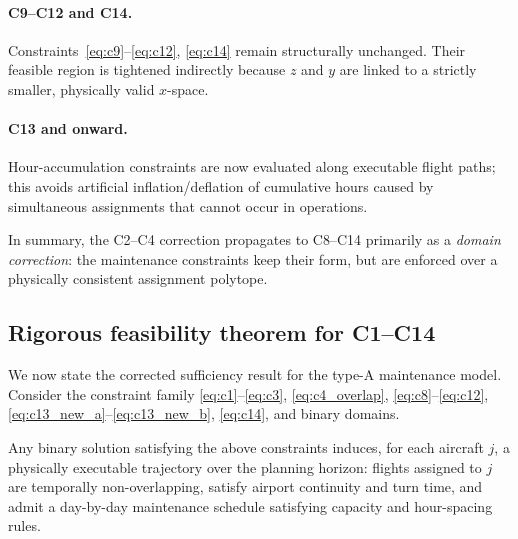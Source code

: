 \paragraph{C9--C12 and C14.}
Constraints~\eqref{eq:c9}--\eqref{eq:c12}, \eqref{eq:c14} remain structurally unchanged. Their
feasible region is tightened indirectly because $z$ and $y$ are linked to a
strictly smaller, physically valid $x$-space.

\paragraph{C13 and onward.}
Hour-accumulation constraints are now evaluated along executable flight paths;
this avoids artificial inflation/deflation of cumulative hours caused by
simultaneous assignments that cannot occur in operations.

In summary, the C2--C4 correction propagates to C8--C14 primarily as a
\emph{domain correction}: the maintenance constraints keep their form, but are
enforced over a physically consistent assignment polytope.

\subsection{Rigorous feasibility theorem for C1--C14}
\label{subsec:feasibility_theorem_c1_c14}

We now state the corrected sufficiency result for the type-A maintenance model.
Consider the constraint family
\eqref{eq:c1}--\eqref{eq:c3}, \eqref{eq:c4_overlap}, \eqref{eq:c8}--\eqref{eq:c12},
\eqref{eq:c13_new_a}--\eqref{eq:c13_new_b}, \eqref{eq:c14}, and binary domains.

\begin{theorem}
  \label{thm:physical_feasibility_c1_c14}
  Any binary solution satisfying the above constraints induces, for each
  aircraft $j$, a physically executable trajectory over the planning horizon:
  flights assigned to $j$ are temporally non-overlapping, satisfy airport
  continuity and turn time, and admit a day-by-day maintenance schedule
  satisfying capacity and hour-spacing rules.
\end{theorem}

